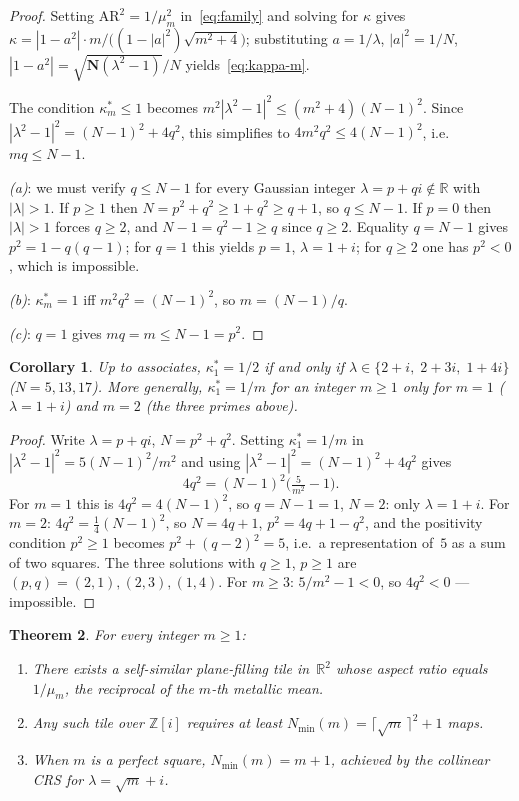 \documentclass{amsart}
\newtheorem{theorem}{Theorem}
\newtheorem{corollary}[theorem]{Corollary}
\theoremstyle{definition}
\theoremstyle{remark}
\begin{document}
\begin{proof}
Setting $\mathrm{AR}^2 = 1/\mu_m^2$ in~\eqref{eq:family}
and solving for $\kappa$ gives
$\kappa = |1-a^2|\cdot m/\bigl((1-|a|^2)\sqrt{m^2+4}\bigr)$;
substituting $a=1/\lambda$, $|a|^2=1/N$,
$|1-a^2|=\sqrt{\mathbf{N}(\lambda^2-1)}/N$
yields~\eqref{eq:kappa-m}.

The condition $\kappa_m^*\leq 1$ becomes
$m^2|\lambda^2-1|^2 \leq (m^2+4)(N\!-\!1)^2$.
Since $|\lambda^2-1|^2 = (N\!-\!1)^2+4q^2$, this simplifies to
$4m^2q^2 \leq 4(N\!-\!1)^2$, i.e.\ $mq\leq N\!-\!1$.

\textit{(a)}: we must verify $q\leq N-1$ for every Gaussian integer
$\lambda=p+qi\notin\mathbb{R}$ with $|\lambda|>1$.
If $p\geq 1$ then $N=p^2+q^2\geq 1+q^2\geq q+1$, so $q\leq N-1$.
If $p=0$ then $|\lambda|>1$ forces $q\geq 2$, and
$N-1=q^2-1\geq q$ since $q\geq 2$.
Equality $q=N\!-\!1$ gives $p^2=1-q(q\!-\!1)$;
for $q=1$ this yields $p=1$, $\lambda=1+i$;
for $q\geq 2$ one has $p^2<0$, which is impossible.

\textit{(b)}: $\kappa_m^*=1$ iff $m^2q^2=(N\!-\!1)^2$,
so $m=(N\!-\!1)/q$.

\textit{(c)}: $q=1$ gives $mq = m \leq N-1 = p^2$.
\end{proof}

\begin{corollary}\label{cor:half}
Up to associates, $\kappa_1^*=1/2$ if and only if
$\lambda\in\{2+i,\;2+3i,\;1+4i\}$ \textup{(}$N=5,13,17$\textup{)}.
More generally, $\kappa_1^* = 1/m$ for an integer $m\geq 1$ only for
$m=1$ \textup{(}$\lambda=1+i$\textup{)} and $m=2$
\textup{(}the three primes above\textup{)}.
\end{corollary}

\begin{proof}
Write $\lambda=p+qi$, $N=p^2+q^2$.  Setting $\kappa_1^*=1/m$ in
$|\lambda^2-1|^2 = 5(N-1)^2/m^2$ and using
$|\lambda^2-1|^2 = (N-1)^2+4q^2$ gives
\[
  4q^2 = (N\!-\!1)^2\!\bigl(\tfrac{5}{m^2}-1\bigr).
\]
For $m=1$ this is $4q^2=4(N\!-\!1)^2$, so $q=N\!-\!1=1$, $N=2$:
only $\lambda=1+i$.
For $m=2$: $4q^2 = \frac14(N\!-\!1)^2$, so $N=4q+1$, $p^2=4q+1-q^2$,
and the positivity condition $p^2\geq 1$ becomes
$p^2+(q-2)^2 = 5$, i.e.\ a representation of~$5$ as a sum of two
squares.  The three solutions with $q\geq 1$, $p\geq 1$ are
$(p,q)=(2,1),(2,3),(1,4)$.
For $m\geq 3$: $5/m^2-1 < 0$, so $4q^2<0$ --- impossible.
\end{proof}

\begin{theorem}\label{thm:metallic}
For every integer $m\geq 1$:
\begin{enumerate}[\upshape(a)]
\item There exists a self-similar plane-filling tile
  in~$\mathbb{R}^2$ whose aspect ratio equals
  $1/\mu_m$, the reciprocal of the $m$-th metallic mean.
\item Any such tile over $\mathbb{Z}[i]$ requires at least
  $N_{\min}(m) = \lceil\sqrt{m}\,\rceil^2 + 1$ maps.
\item When $m$ is a perfect square, $N_{\min}(m) = m+1$, achieved
  by the collinear CRS for $\lambda = \sqrt{m}+i$.
\end{enumerate}
\end{theorem}
\end{document}
